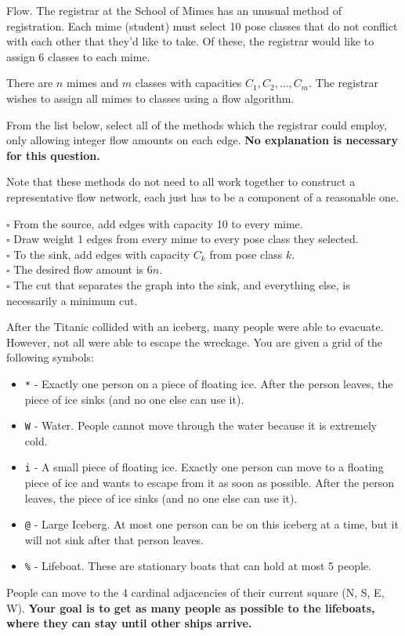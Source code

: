 \documentclass[12pt]{exam}
\newcommand{\stars}[1]{%
    \foreach \n in {1,...,#1}{%
        $\filledstar$%
    }%
}
\begin{document}
\begin{questions}

\question[15] [W8, \stars{3}] Flow. The registrar at the School of Mimes has an unusual method of registration. Each mime (student) must select 10 pose classes that do not conflict with each other that they'd like to take. Of these, the registrar would like to assign 6 classes to each mime.

There are $n$ mimes and $m$ classes with capacities $C_1, C_2, \dots, C_m$. The registrar wishes to assign all mimes to classes using a flow algorithm.

From the list below, select all of the methods which the registrar could employ, only allowing integer flow amounts on each edge. \textbf{No explanation is necessary for this question.}

Note that these methods do not need to all work together to construct a representative flow network, each just has to be a component of a reasonable one.

$\square$ From the source, add edges with capacity 10 to every mime. \\
$\square$ Draw weight 1 edges from every mime to every pose class they selected. \\
$\square$ To the sink, add edges with capacity $C_k$ from pose class $k$. \\
$\square$ The desired flow amount is $6n$. \\
$\square$ The cut that separates the graph into the sink, and everything else, is necessarily a minimum cut.

\clearpage

\question[40] [W7, \stars{5}] 
After the Titanic collided with an iceberg, many people were able to evacuate.
However, not all were able to escape the wreckage.
You are given a grid of the following symbols:
\begin{itemize}
    \item \texttt{*} - Exactly one person on a piece of floating ice.
    After the person leaves, the piece of ice sinks (and no one else can use it).
    \item \texttt{W} - Water. People cannot move through the water because it is extremely cold.
    \item \texttt{i} - A small piece of floating ice. Exactly one person can move to a floating piece of ice and wants to escape from it as soon as possible. After the person leaves, the piece of ice sinks (and no one else can use it).
    \item \texttt{@} - Large Iceberg. At most one person can be on this iceberg at a time, but it will not sink after that person leaves.
    \item \texttt{\%} - Lifeboat. These are stationary boats that can hold at most 5 people.
\end{itemize}
People can move to the 4 cardinal adjacencies of their current square (N, S, E, W).
\textbf{Your goal is to get as many people as possible to the lifeboats, where they can stay until other ships arrive.}


\end{questions}
\end{document}
